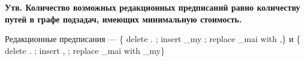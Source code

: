 \documentclass[10pt]{beamer}
\begin{document}
\begin{frame}
\begin{small}
\textbf{Утв. Количество возможных редакционных предписаний равно количеству путей в графе подзадач, имеющих минимальную стоимость.}

{\begin{figure}
    \captionsetup{}
\end{figure}}

Редакционные предписания --- \{{\color{red} delete .} ; {\color{orange}insert \_my} ; {\color{blue}replace \_mai with ,}\} и \{{\color{red} delete .} ; {\color{orange}insert ,} ; {\color{blue}replace \_mai with \_my}\}

\end{small}

\end{frame}








\end{document}
